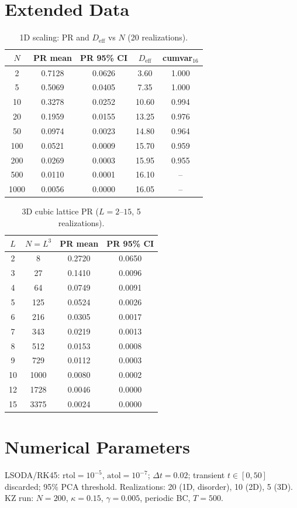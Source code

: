 \documentclass[aps,pre,12pt]{revtex4-2}
\begin{document}
\section{Extended Data}

\begin{table}[htbp]
\centering
\caption{1D scaling: PR and $D_{\text{eff}}$ vs $N$ (20 realizations).}
\label{tab:1d}
\begin{tabular}{ccccc}
\toprule
$N$ & PR mean & PR 95\% CI & $D_{\text{eff}}$ & cumvar$_{16}$ \\
\midrule
2    & 0.7128 & 0.0626 & 3.60  & 1.000 \\
5    & 0.5069 & 0.0405 & 7.35  & 1.000 \\
10   & 0.3278 & 0.0252 & 10.60 & 0.994 \\
20   & 0.1959 & 0.0155 & 13.25 & 0.976 \\
50   & 0.0974 & 0.0023 & 14.80 & 0.964 \\
100  & 0.0521 & 0.0009 & 15.70 & 0.959 \\
200  & 0.0269 & 0.0003 & 15.95 & 0.955 \\
500  & 0.0110 & 0.0001 & 16.10 & --   \\
1000 & 0.0056 & 0.0000 & 16.05 & --   \\
\bottomrule
\end{tabular}
\end{table}

\begin{table}[htbp]
\centering
\caption{3D cubic lattice PR ($L=2$--$15$, 5 realizations).}
\label{tab:3d}
\begin{tabular}{cccc}
\toprule
$L$ & $N=L^3$ & PR mean & PR 95\% CI \\
\midrule
2  & 8    & 0.2720 & 0.0650 \\
3  & 27   & 0.1410 & 0.0096 \\
4  & 64   & 0.0749 & 0.0091 \\
5  & 125  & 0.0524 & 0.0026 \\
6  & 216  & 0.0305 & 0.0017 \\
7  & 343  & 0.0219 & 0.0013 \\
8  & 512  & 0.0153 & 0.0008 \\
9  & 729  & 0.0112 & 0.0003 \\
10 & 1000 & 0.0080 & 0.0002 \\
12 & 1728 & 0.0046 & 0.0000 \\
15 & 3375 & 0.0024 & 0.0000 \\
\bottomrule
\end{tabular}
\end{table}

\section{Numerical Parameters}
LSODA/RK45: $\text{rtol}=10^{-5}$, $\text{atol}=10^{-7}$; $\Delta t=0.02$; transient $t\in[0,50]$ discarded; 95\% PCA threshold. Realizations: 20 (1D, disorder), 10 (2D), 5 (3D). KZ run: $N=200$, $\kappa=0.15$, $\gamma=0.005$, periodic BC, $T=500$.
\end{document}
